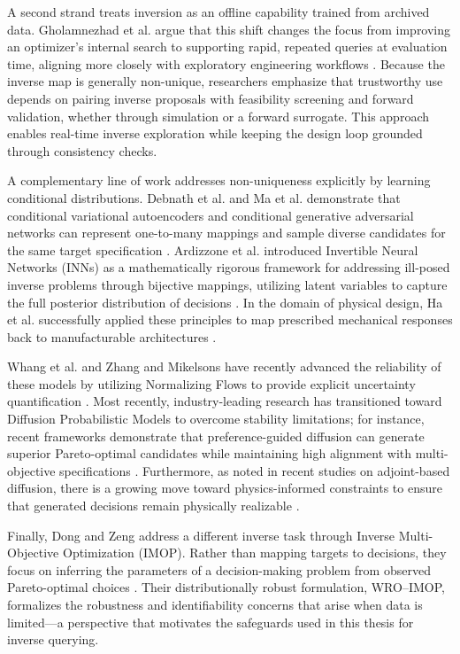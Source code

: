 A second strand treats inversion as an offline capability trained from archived data. Gholamnezhad et al. argue that this shift changes the focus from improving an optimizer’s internal search to supporting rapid, repeated queries at evaluation time, aligning more closely with exploratory engineering workflows \cite{Gholamnezhad2022}. Because the inverse map is generally non-unique, researchers emphasize that trustworthy use depends on pairing inverse proposals with feasibility screening and forward validation, whether through simulation or a forward surrogate. This approach enables real-time inverse exploration while keeping the design loop grounded through consistency checks.

A complementary line of work addresses non-uniqueness explicitly by learning conditional distributions. Debnath et al. and Ma et al. demonstrate that conditional variational autoencoders and conditional generative adversarial networks can represent one-to-many mappings and sample diverse candidates for the same target specification \cite{Debnath2021JMI, Ma2019AdvMater}. Ardizzone et al. introduced Invertible Neural Networks (INNs) as a mathematically rigorous framework for addressing ill-posed inverse problems through bijective mappings, utilizing latent variables to capture the full posterior distribution of decisions \cite{Ardizzone2019INN}. In the domain of physical design, Ha et al. successfully applied these principles to map prescribed mechanical responses back to manufacturable architectures \cite{Ha2023NatComm}. 

Whang et al. and Zhang and Mikelsons have recently advanced the reliability of these models by utilizing Normalizing Flows to provide explicit uncertainty quantification \cite{Whang2021, Zhang2022IMFlow}. Most recently, industry-leading research has transitioned toward Diffusion Probabilistic Models to overcome stability limitations; for instance, recent frameworks demonstrate that preference-guided diffusion can generate superior Pareto-optimal candidates while maintaining high alignment with multi-objective specifications \cite{PreferenceDiffusion2025}. Furthermore, as noted in recent studies on adjoint-based diffusion, there is a growing move toward physics-informed constraints to ensure that generated decisions remain physically realizable \cite{AdjointDiffusion2026}.

Finally, Dong and Zeng address a different inverse task through Inverse Multi-Objective Optimization (IMOP). Rather than mapping targets to decisions, they focus on inferring the parameters of a decision-making problem from observed Pareto-optimal choices \cite{DongZeng2020ICML, DongZeng2021AAAI}. Their distributionally robust formulation, WRO--IMOP, formalizes the robustness and identifiability concerns that arise when data is limited—a perspective that motivates the safeguards used in this thesis for inverse querying.

